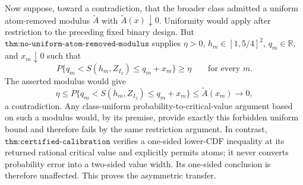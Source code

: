 Now suppose, toward a contradiction, that the broader class admitted a uniform atom-removed modulus \(\widetilde A\) with \(\widetilde A(x)\downarrow0\).  Uniformity would apply after restriction to the preceding fixed binary design.  But \(\texttt{thm:no-uniform-atom-removed-modulus}\) supplies \(\eta>0\), \(h_m\in[1,5/4]^2\), \(q_m\in\mathbb R\), and \(x_m\downarrow0\) such that
\[
 P\{q_m<S(h_m,Z_{I_2})\leq q_m+x_m\}\geq\eta
 \qquad\text{for every }m.
\]
The asserted modulus would give
\[
 \eta
 \leq P\{q_m<S(h_m,Z_{I_2})\leq q_m+x_m\}
 \leq \widetilde A(x_m)
 \longrightarrow0,
\]
a contradiction.  Any class-uniform probability-to-critical-value argument based on such a modulus would, by its premise, provide exactly this forbidden uniform bound and therefore fails by the same restriction argument.  In contrast, \(\texttt{thm:certified-calibration}\) verifies a one-sided lower-CDF inequality at its returned rational critical value and explicitly permits atoms; it never converts probability error into a two-sided value width.  Its one-sided conclusion is therefore unaffected.  This proves the asymmetric transfer.
